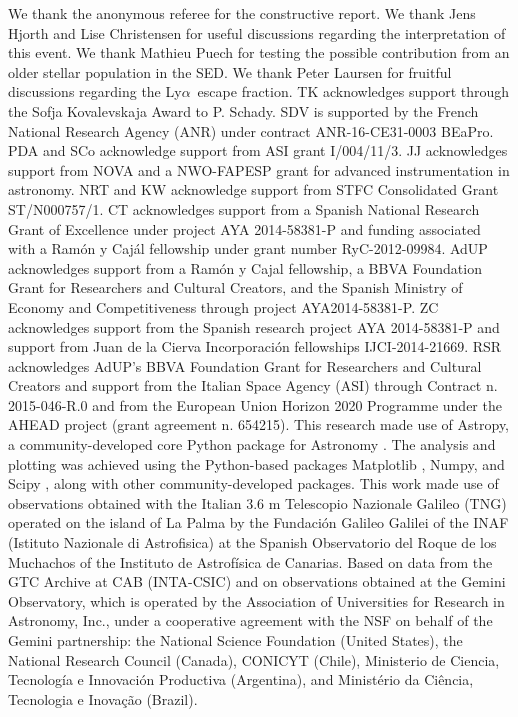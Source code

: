 \documentclass[longauth]{aa}    %
\newcommand{\lya}{Ly$\alpha$}
\begin{document}
\begin{acknowledgements}
We thank the anonymous referee for the constructive report. 
%
We thank Jens Hjorth and Lise Christensen for useful discussions regarding the interpretation of this event. We thank Mathieu Puech for testing the possible contribution from an older stellar population in the SED. We thank Peter Laursen for fruitful discussions regarding the \lya~escape fraction.
%       
TK acknowledges support through the Sofja Kovalevskaja Award to P. Schady.
%
SDV is supported by the French National Research Agency (ANR) under contract ANR-16-CE31-0003 BEaPro.
%
PDA and SCo acknowledge support from ASI grant I/004/11/3.
%
JJ acknowledges support from NOVA and a NWO-FAPESP grant for advanced
instrumentation in astronomy.
%
NRT and KW acknowledge support from STFC Consolidated
Grant ST/N000757/1.
%
CT acknowledges support from a Spanish National Research Grant of Excellence
under project AYA 2014-58381-P and funding associated with a Ramón y Cajál
fellowship under grant number RyC-2012-09984.
%
AdUP acknowledges support from a Ramón y Cajal fellowship, a BBVA Foundation
Grant for Researchers and Cultural Creators, and the Spanish Ministry of Economy
and Competitiveness through project AYA2014-58381-P.
%
ZC acknowledges support from the Spanish research project AYA 2014-58381-P and
support from Juan de la Cierva Incorporaci\'on fellowships IJCI-2014-21669.
%
RSR acknowledges AdUP's BBVA Foundation Grant for Researchers and Cultural
Creators and support from the Italian Space Agency (ASI) through  Contract n. 2015-046-R.0 and from the European Union Horizon 2020 Programme under the AHEAD project (grant agreement n. 654215).
%
This research made use of Astropy, a community-developed core Python package for Astronomy \citep{TheAstropyCollaboration2013}. The analysis and plotting was achieved using the Python-based packages Matplotlib \citep{Hunter2007}, Numpy, and Scipy \citep{VanderWalt2011}, along with other community-developed packages.
%
This work made use of observations obtained with the Italian 3.6 m Telescopio Nazionale Galileo (TNG) operated on the island of La Palma by the Fundaci\'on Galileo Galilei of the INAF (Istituto Nazionale di Astrofisica) at the Spanish Observatorio del Roque de los Muchachos of the Instituto de Astrof\'isica de Canarias.
%
Based on data from the GTC Archive at CAB (INTA-CSIC) and on observations obtained at the Gemini Observatory, which is operated by the Association of Universities for Research in Astronomy, Inc., under a cooperative agreement with the NSF on behalf of the Gemini partnership: the National Science Foundation (United States), the National Research Council (Canada), CONICYT (Chile), Ministerio de Ciencia, Tecnología e Innovación Productiva (Argentina), and Ministério da Ciência, Tecnologia e Inovação (Brazil).

\end{acknowledgements}



\end{document}
